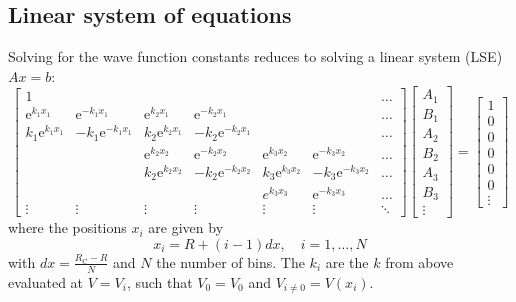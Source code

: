 \documentclass[a4paper,DIV=12,english]{scrartcl}
\begin{document}
\subsection{Linear system of equations}
Solving for the wave function constants reduces to solving a linear system (LSE) $Ax = b$:
\begin{equation}
    \begin{bmatrix}
        1 & & & & & & \dots \\
        \text{e}^{k_1 x_1} & \text{e}^{-k_1 x_1} & \text{e}^{k_2 x_1} & \text{e}^{-k_2 x_1} & & & \dots \\
        k_1\text{e}^{k_1 x_1} & -k_1\text{e}^{-k_1 x_1} & k_2\text{e}^{k_2 x_1} & -k_2\text{e}^{-k_2 x_1} & & & \dots \\
        & & \text{e}^{k_2 x_2} & \text{e}^{-k_2 x_2} & \text{e}^{k_3 x_2} & \text{e}^{-k_3 x_2} & \dots \\
        & & k_2\text{e}^{k_2 x_2} & -k_2\text{e}^{-k_2 x_2} & k_3\text{e}^{k_3 x_2} & -k_3\text{e}^{-k_3 x_2} & \dots \\
        & & & & {e}^{k_3 x_3} & \text{e}^{-k_3 x_3} & \dots \\
        \vdots & \vdots & \vdots & \vdots & \vdots & \vdots & \ddots 
    \end{bmatrix}
    \begin{bmatrix}
        A_1 \\
        B_1 \\
        A_2 \\
        B_2 \\
        A_3 \\
        B_3 \\
        \vdots
    \end{bmatrix}
    =
    \begin{bmatrix}
        1 \\
        0 \\
        0 \\
        0 \\
        0 \\
        0 \\
        \vdots
    \end{bmatrix}
\end{equation}
where the positions $x_i$ are given by 
\begin{equation}
    x_i = R + (i-1) dx,\quad i = 1, \dots, N
\end{equation}
with $dx = \frac{R_\text{C} - R}{N}$ and $N$ the number of bins. The $k_i$ are the $k$ from above evaluated at $V = V_i$, such that $V_0 = V_0$ and $V_{i\neq 0} = V(x_i)$.
\end{document}
